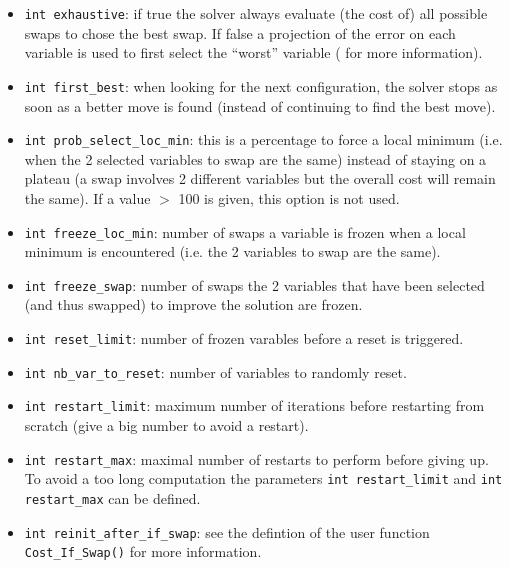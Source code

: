 \documentclass{article}
\begin{document}
\begin{itemize}		

\item \texttt{int exhaustive}: if true the solver always evaluate (the
 cost of) all possible swaps to chose the best swap. If false a projection of
 the error on each variable is used to first select the ``worst'' variable
 (\cite{saga01} for more information).

\item \texttt{int first\_best}: when looking for the next configuration, the
  solver stops as soon as a better move is found (instead of continuing to
  find the best move).

\item \texttt{int prob\_select\_loc\_min}: this is a percentage to force a
 local minimum (i.e. when the 2 selected variables to swap are the same)
 instead of staying on a plateau (a swap involves 2 different variables but
 the overall cost will remain the same). If a value $>$ 100 is given, this
 option is not used.

\item \texttt{int freeze\_loc\_min}: number of swaps a variable is frozen
 when a local minimum is encountered (i.e. the 2 variables to swap are the
 same).

\item \texttt{int freeze\_swap}: number of swaps the 2 variables that have
 been selected (and thus swapped) to improve the solution are frozen.

\item \texttt{int reset\_limit}: number of frozen varables before a reset
 is triggered.

\item \texttt{int nb\_var\_to\_reset}: number of variables to randomly
 reset.

\item \texttt{int restart\_limit}: maximum number of iterations before
 restarting from scratch (give a big number to avoid a restart).

\item \texttt{int restart\_max}: maximal number of restarts to perform before
  giving up. To avoid a too long computation the parameters \texttt{int
    restart\_limit} and \texttt{int restart\_max} can be defined.

\item \texttt{int reinit\_after\_if\_swap}: see the defintion of the user 
 function \texttt{Cost\_If\_Swap()} for more information.

\end{itemize}
\end{document}

